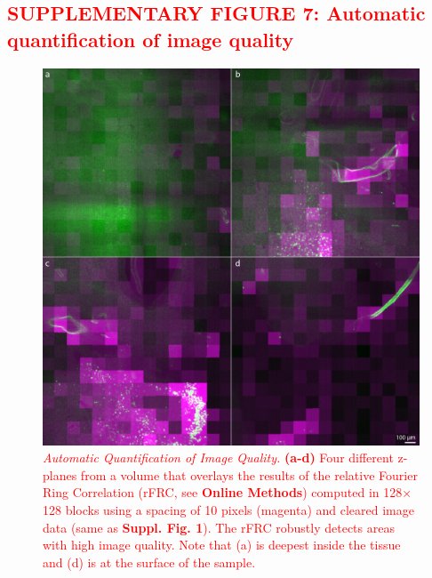 \documentclass[]{spie}  %
\def\red{\textcolor{red}}
\begin{document}
\subsection*{\red{SUPPLEMENTARY FIGURE 7: Automatic quantification of image quality}}
\vspace{1mm}
\begin{figure}[h!]
\includegraphics[width=\textwidth]{rFRC.jpg}
\vspace{-2.0mm}
\caption{\hspace{-0.5mm} \red{\emph{Automatic Quantification of Image Quality.} \textbf{(a-d)} Four different z-planes from a volume that overlays the results of the relative Fourier Ring Correlation (rFRC, see \textbf{Online Methods}) computed in 128$\times$128 blocks using a spacing of 10 pixels (magenta) and cleared image data (same as \textbf{Suppl. Fig. 1}). The rFRC robustly detects areas with high image quality. Note that (a) is deepest inside the tissue and (d) is at the surface of the sample.
}}
\label{fig:sup-rFRC}
\end{figure}

\pagebreak
\end{document}
